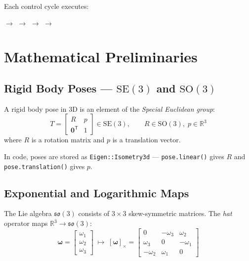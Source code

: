 \documentclass[11pt,a4paper]{article}
\newcommand{\R}{\mathbb{R}}
\newcommand{\SE}{\mathrm{SE}}
\newcommand{\SO}{\mathrm{SO}}
\newcommand{\so}{\mathfrak{so}}
\newcommand{\tr}{\mathsf{T}}
\begin{document}
Each control cycle executes:

\begin{center}
\;$\to$\;
\;$\to$\;
\;$\to$\;
\;$\to$\;
\end{center}


\section{Mathematical Preliminaries}
\label{sec:prelim}

\subsection{Rigid Body Poses --- $\SE(3)$ and $\SO(3)$}
\label{sec:SE3}

A rigid body pose in 3D is an element of the \emph{Special Euclidean group}:
\[
  T = \begin{bmatrix} R & p \\ \bm{0}^\tr & 1 \end{bmatrix} \in \SE(3),
  \qquad R \in \SO(3),\; p \in \R^3
\]
where $R$ is a rotation matrix and $p$ is a translation vector.

In code, poses are stored as \texttt{Eigen::Isometry3d} ---
\texttt{pose.linear()} gives $R$ and \texttt{pose.translation()} gives $p$.

\subsection{Exponential and Logarithmic Maps}
\label{sec:explog}

The Lie algebra $\so(3)$ consists of $3\!\times\!3$ skew-symmetric matrices.
The \emph{hat} operator maps $\R^3 \to \so(3)$:
\[
  \bm{\omega}
  = \begin{bmatrix} \omega_1 \\ \omega_2 \\ \omega_3 \end{bmatrix}
  \;\mapsto\;
  [\bm{\omega}]_\times
  = \begin{bmatrix}
      0         & -\omega_3 & \omega_2 \\
      \omega_3  & 0         & -\omega_1 \\
      -\omega_2 & \omega_1  & 0
    \end{bmatrix}
\]
\end{document}
